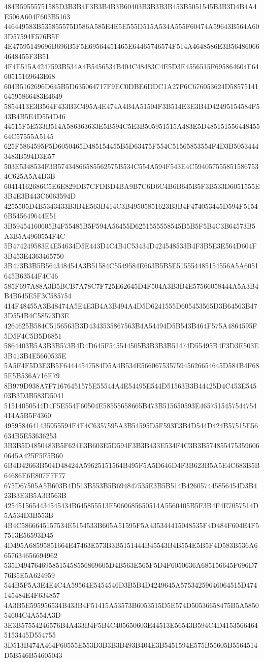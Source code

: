 {{{{{{{{{{{{{{{{{{{{{484B59555751585D3B3B4F3B3B4B3B60403B3B3B3B453B5051545B3B3D4B4A4E506A604F603B5163
446449583B535855575D586A585E4E5E555D515A534A555F60474A59643B564A603D57594E576B5F
4E47595149696B696B5F5E69564451465E64465746574F514A4648586E3B564860664648455F3B51
4F4E515A4247593B534A4B5456534B404C48483C4E5D3E4556515F695864604F6460515169643E68
604B5162696D645B5D635064717F9EC0DBE6DDC1A27F6C676053624D5857514164595866483E4649
5854413E3B564F433B3C495A4E474A4B4A51504F3B514E3E3B4D42495154584F543B4B5E4D554D46
44515F5E533B514A586363633E5B594C5E3B505951515A483E5D48515155644845564C57555A5145
625F5864595F5D6050465D485154455B5D63475F554C51565853554F4D3B50534443483B594D3E57
503E5348534F3B57434866585562575B534C554A594F543E4C5940575558515867534C625A5A4D3B
60414162686C5E6E829DB7CFDBD4BA9B7C6D6C4B6B645B5F3B533D6051555E3B4E3B443C6063594D
4255505D4B5343433B3B4E563B414C3B49505851623B3B4F474053445D594F51546B545649644E51
3B59454160605B4F55485B5F594A56455D6251555558545B5B5F5B4C3B64573B5A3B5A4960554F4C
5B474249583E4E54634D5E443D4C4B4C53434D424548533B4F3B5E3E564D604F3B453E4363465750
3B473B3B5B564348454A3B51584C5549584E663B5B5E515554485154556A5A6051645B63544F4C46
585F697A88A3B5BCB7A78C7F725E62645D4F504A3B3B4E57566058444A5A3B4B4B645E5F3C585754
414F48455A3B48474A5E4E3B4A3B494A4D5D6241555D605453565D3B64563B473D554B4C58573D3E
4264625B584C5156563B3D4343535867563B4A54494D5B543B464F575A4864595F5D5F4C5B5D6851
5864403B5A3B3B573B4D4D645F545544505B3B3B3B51474D55495B4F3D3E503E3B413B4E5660535E
5A5F4F5D3E3B5F64444547584D5A4B534E56606753575945626654645D584B4F685E5B536A716E79
8B979D938A7F71676451575E55544A4E54495E544D51563B3B44425D4C453E54503B3D3B583D5041
51514050544D4F5E554F60504E58555658665B473B515650593E4657515457544754414A5B5F4360
4959584641435955594F4F4C6357595A3B54595D5F593E3B4D544D424B57515E56634B5E53636253
3B3B5D4850483B5F624E3B603E5D594F3B3B433E534F4C3B3B5748554753596060645A425F5F5B60
6B4D42663B504D48424A59625151564B495F5A5D646D4F3B623B5A5E4C683B5B64686E6E807F7F77
675D67505A5B603B4D513B553B5B694847535E3B5B514B426057445856454D3B423B3E3B5A3B563B
4254515654434545434B645855513E5060685650514A5560405B5F3B4F4E7057514D5A534D3B553B
4B4C5866645157534E5154533B605A51595F5A435344415048535F4D484F604E4F57513E56593D45
4D495A68595851664E47463E573B3B5151444B45543B4B554E5B5F4D583B536A6657634656694962
535D4947646958515458556869605D4B563E565F5D4F6050636A685156645F696D776B5E5A624959
544B5F5A3E4E4C4A59564E5454546D3B5B4D4249645A57534259646064515D474145484E4F634857
4A3B5E595956534B433B4F51415A53573B6053515D5E574D50536658475B5A585054604C4A554A3D
3E3B57554246576B4A433B4F5B4C405650603E44513E56543B594C4D41535664645153445D554755
3D513B474A464F60555E553D3B3B3B493B404E3B5451594E575B55605B5564514D5B546B54605043
}}}}}}}}}}}}}}}}}}}}}
